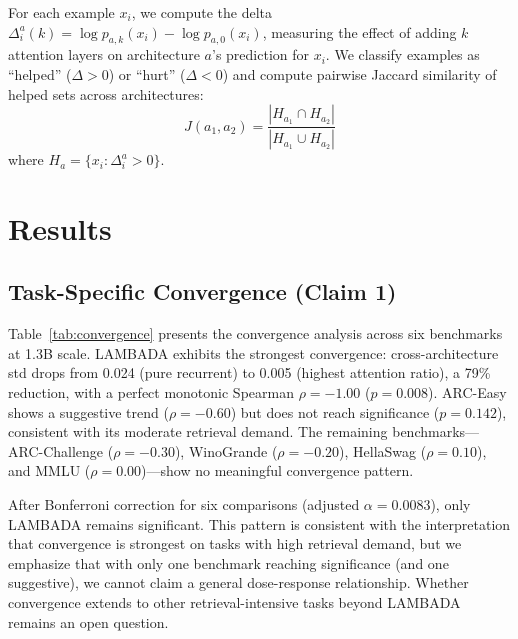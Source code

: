 \documentclass[11pt,a4paper]{article}
\begin{document}
For each example $x_i$, we compute the delta $\Delta_i^{a}(k) = \log p_{a,k}(x_i) - \log p_{a,0}(x_i)$, measuring the effect of adding $k$ attention layers on architecture $a$'s prediction for $x_i$. We classify examples as ``helped'' ($\Delta > 0$) or ``hurt'' ($\Delta < 0$) and compute pairwise Jaccard similarity of helped sets across architectures:
\[
J(a_1, a_2) = \frac{|H_{a_1} \cap H_{a_2}|}{|H_{a_1} \cup H_{a_2}|}
\]
where $H_a = \{x_i : \Delta_i^a > 0\}$.

\section{Results}

\subsection{Task-Specific Convergence (Claim 1)}
\label{sec:task-specific}

Table~\ref{tab:convergence} presents the convergence analysis across six benchmarks at 1.3B scale. LAMBADA exhibits the strongest convergence: cross-architecture std drops from 0.024 (pure recurrent) to 0.005 (highest attention ratio), a 79\% reduction, with a perfect monotonic Spearman $\rho{=}{-}1.00$ ($p{=}0.008$). ARC-Easy shows a suggestive trend ($\rho{=}{-}0.60$) but does not reach significance ($p{=}0.142$), consistent with its moderate retrieval demand. The remaining benchmarks---ARC-Challenge ($\rho{=}{-}0.30$), WinoGrande ($\rho{=}{-}0.20$), HellaSwag ($\rho{=}0.10$), and MMLU ($\rho{=}0.00$)---show no meaningful convergence pattern.

After Bonferroni correction for six comparisons (adjusted $\alpha = 0.0083$), only LAMBADA remains significant. This pattern is consistent with the interpretation that convergence is strongest on tasks with high retrieval demand, but we emphasize that with only one benchmark reaching significance (and one suggestive), we cannot claim a general dose-response relationship. Whether convergence extends to other retrieval-intensive tasks beyond LAMBADA remains an open question.
\end{document}
